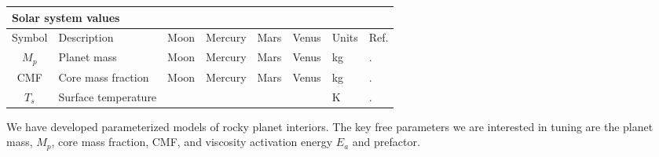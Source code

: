 \begin{table}
\begin{tabular}{@{} c l r r r r l p{3cm} @{}}
\multicolumn{8}{l}{\textbf{Solar system values}} \\
\toprule
Symbol & Description & Moon & Mercury & Mars & Venus & Units & Ref. \\
\midrule
$M_p$ & Planet mass & Moon & Mercury & Mars & Venus & kg & . \\
CMF & Core mass fraction & Moon & Mercury & Mars & Venus & kg & . \\
$T_s$ & Surface temperature & & & & & K & . \\
\bottomrule
\end{tabular}


%

\end{table}


We have developed parameterized models of rocky planet interiors. The key free parameters we are interested in tuning are the planet mass, $M_p$, core mass fraction, CMF, and viscosity activation energy $E_a$ and prefactor. 

